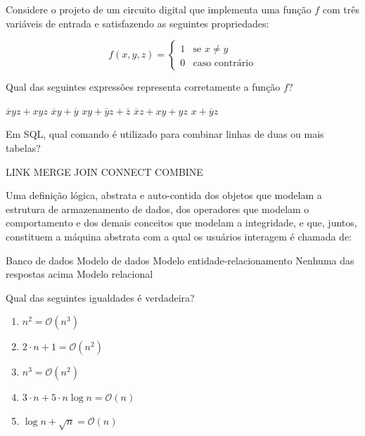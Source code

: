\documentclass[12pt, addpoints]{exam}
\begin{document}
    \begin{questions}

    \newpage
    \question
Considere o projeto de um circuito digital que implementa uma função \( f \) com três variáveis de entrada e satisfazendo as seguintes propriedades:

\[
f(x, y, z) = 
\begin{cases} 
1 & \text{se } x \neq y \\ 
0 & \text{caso contrário} 
\end{cases}
\]

Qual das seguintes expressões representa corretamente a função \( f \)?
\begin{choices}
\choice \( \overline{x}y z + x y z \)
\choice \( \overline{x}y + \overline{y} \)
\choice \( xy + \overline{y}z + \overline{z} \)
\choice \( \overline{x}z + xy + yz \)
\choice \( x + \overline{y}z \)
\end{choices}

\question
Em SQL, qual comando é utilizado para combinar linhas de duas ou mais tabelas?

\begin{choices}
\choice LINK
\choice MERGE
\choice JOIN
\choice CONNECT
\choice COMBINE
\end{choices}

\question
Uma definição lógica, abstrata e auto-contida dos objetos que modelam a
estrutura de armazenamento de dados, dos operadores que modelam o comportamento
e dos demais conceitos que modelam a integridade, e que, juntos, constituem a
máquina abstrata com a qual os usuários interagem é chamada de:

\begin{choices}
\choice Banco de dados
\choice Modelo de dados
\choice Modelo entidade-relacionamento
\choice Nenhuma das respostas acima
\choice Modelo relacional
\end{choices}

\question
Qual das seguintes igualdades é verdadeira?

\begin{enumerate}
    \item[(I)] \( n^2 = \mathcal{O}(n^3) \)
    \item[(II)] \( 2 \cdot n + 1 = \mathcal{O}(n^2) \)
    \item[(III)] \( n^3 = \mathcal{O}(n^2) \)
    \item[(IV)] \( 3 \cdot n + 5 \cdot n \log n = \mathcal{O}(n) \)
    \item[(V)] \( \log n + \sqrt{n} = \mathcal{O}(n) \)
\end{enumerate}


\end{questions}
\end{document}
